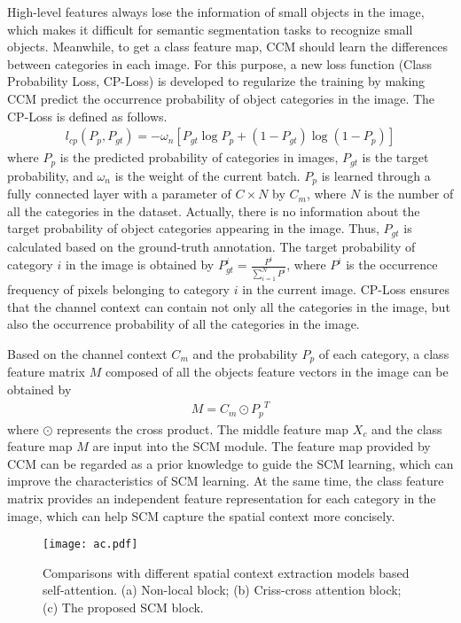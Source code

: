 \documentclass[10pt,journal,cspaper,compsoc]{IEEEtran}
\begin{document}
High-level features always lose the information of small objects in the image, which makes it difficult for semantic segmentation tasks to recognize small objects. Meanwhile, to get a class feature map, CCM should learn the differences between categories in each image. For this purpose, a new loss function (Class Probability Loss, CP-Loss) is developed to regularize the training by making CCM predict the occurrence probability of object categories in the image. The CP-Loss is defined as follows.
\begin{align}
	l_{cp}(P_{p},P_{gt})=-\omega _{n}[P_{gt}\log P_{p}+(1-P_{gt})\log (1-P_{p})]
\end{align}
where $P_{p}$ is the predicted probability of categories in images, $P_{gt}$ is the target probability, and $\omega _{n}$ is the weight of the current batch. $P_{p}$ is learned through a fully connected layer with a parameter of $C\times N$ by $C_{m}$, where $N$ is the number of all the categories in the dataset. Actually, there is no information about the target probability of object categories appearing in the image. Thus, $P_{gt}$ is calculated based on the ground-truth annotation. The target probability of category $i$ in the image is obtained by $P_{gt}^{i}=\frac{P^{i}}{\sum_{i=1}^{N}P^{i}}$, where $P^{i}$ is the occurrence frequency of pixels belonging to category $i$ in the current image. CP-Loss ensures that the channel context can contain not only all the categories in the image, but also the occurrence probability of all the categories in the image.
	
Based on the channel context $C_{m}$ and the probability $P_{p}$ of each category, a class feature matrix $M$ composed of all the objects feature vectors in the image can be obtained by
\begin{align}
	M = {C_m} \odot {{P_p}^{T}}
\end{align}
where $\odot$ represents the cross product. The middle feature map $X_{c}$ and the class feature map $M$ are input into the SCM module. The feature map provided by CCM can be regarded as a prior knowledge to guide the SCM learning, which can improve the characteristics of SCM learning. At the same time, the class feature matrix provides an independent feature representation for each category in the image, which can help SCM capture the spatial context more concisely.
	
\begin{figure}
\centering
\texttt{[image: ac.pdf]}
\caption{Comparisons with different spatial context extraction models based self-attention. (a) Non-local block; (b) Criss-cross attention block; (c) The proposed SCM block.}
\label{fig5}
\vspace{-4mm}
\end{figure}
	
\end{document}
